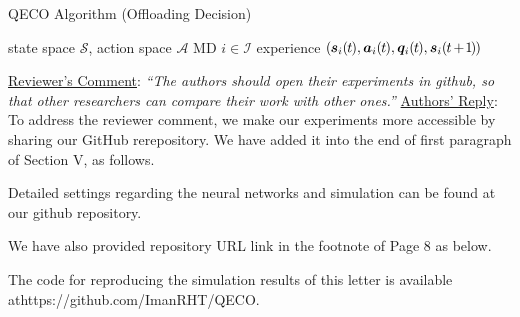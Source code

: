 \documentclass[12pt,draftclsnofoot,onecolumn]{IEEEtran}
\newcommand{\rev}[1]{{\color{blue}#1}} %
\newcommand{\rev}[1]{#1}
\newenvironment{my}[2]%
{\begin{list}{}%
{\setlength{\rightmargin}{#1}\setlength{\leftmargin}{#2}}%


 \item[]{}

} {\end{list}}
\begin{document}
\begin{enumerate}
\begin{my}{0.5cm}{0.5cm}
{\begin{minipage}[b]{0.87\textwidth} 
	\begin{algorithm}[H] \caption{QECO Algorithm (Offloading Decision)}\label{alg:cap2} \centering 
		\begin{algorithmic}[1] \renewcommand{\algorithmicrequire}{\textbf{Input:}} \renewcommand{\algorithmicensure}{\textbf{Output:}}\Require state space $\mathcal{S}$, action space $\mathcal{A}$
			\Ensure MD $i \in \mathcal{I}$ experience  \textcolor{blue}{ $(\hspace{-0.2mm}\boldsymbol{s}_i(\hspace{-0.2mm}t\hspace{-0.2mm}), \boldsymbol{a}_i(\hspace{-0.2mm}t\hspace{-0.2mm}), \boldsymbol{q}_i(\hspace{-0.2mm}t\hspace{-0.2mm}), \boldsymbol{s}_i(\hspace{-0.2mm}t\hspace{-0.3mm}+\hspace{-0.3mm}\hspace{-0.2mm}1\hspace{-0.2mm}\hspace{-0.2mm})\hspace{-0.2mm})$}
		\end{algorithmic} 
	\end{algorithm} 
\end{minipage}}
\end{my}
	

\vspace{10mm}
	\item \underline{Reviewer's Comment}: 
	\textit{``The authors should open their experiments in github, so that other researchers can compare their work with other ones.''} \newline
	\underline{Authors' Reply}: To address the reviewer comment, we make our experiments more accessible by sharing our GitHub rerepository. We have added it into the end of first paragraph of Section V, as follows.
	\begin{my}{1cm}{1cm}
		\rev{Detailed settings regarding the neural networks and simulation can be found at our github repository. }
	\end{my}
	We have also provided repository URL link in the footnote of Page 8 as below.
	\begin{my}{1cm}{1cm}
		\rev{The code for reproducing the simulation results of this letter is available at\newline https://github.com/ImanRHT/QECO.} \newline
	\end{my}


\end{enumerate}
\end{document}
